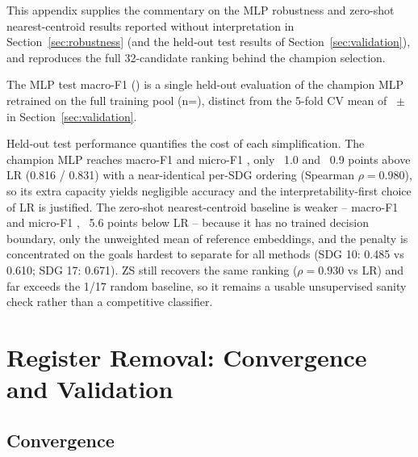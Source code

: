\documentclass[12pt,a4paper]{article}
\let\OldSection\section
\renewcommand{\section}{\clearpage\FloatBarrier\OldSection}
\begin{document}
This appendix supplies the commentary on the MLP robustness and zero-shot
nearest-centroid results reported without interpretation in
Section~\ref{sec:robustness} (and the held-out test results of
Section~\ref{sec:validation}), and reproduces the full 32-candidate ranking
behind the champion selection.

The MLP test macro-F1 (\MlpMacroFOne{}) is a single held-out evaluation of the
champion MLP retrained on the full training pool (n=\NTrainPool{}), distinct
from the 5-fold CV mean of \MlpCvMacroFone{}~$\pm$~\MlpCvMacroFoneStd{} in
Section~\ref{sec:validation}.

Held-out test performance quantifies the cost of each simplification. The
champion MLP reaches macro-F1 \MlpMacroFOne{} and micro-F1 \MlpMicroFOne{}, only
~1.0 and ~0.9 points above LR (0.816 / 0.831) with a near-identical per-SDG
ordering (Spearman $\rho = 0.980$), so its extra capacity yields negligible
accuracy and the interpretability-first choice of LR is justified. The zero-shot
nearest-centroid baseline is weaker -- macro-F1 \ZsMacroFOne{} and micro-F1
\ZsMicroFOne{}, ~5.6 points below LR -- because it has no trained decision
boundary, only the unweighted mean of reference embeddings, and the penalty is
concentrated on the goals hardest to separate for all methods (SDG 10: 0.485 vs
0.610; SDG 17: 0.671). ZS still recovers the same ranking ($\rho = 0.930$
vs LR) and far exceeds the 1/17 random baseline, so it remains a usable
unsupervised sanity check rather than a competitive classifier.

\begin{table}[ht]
\centering
\footnotesize
\caption{Model selection ranking (full): 5-fold GroupKFold cross-validated macro-F1 across all 32 candidates (16 MLP + 16 LR).}
\label{tab:model-selection-appendix}

\end{table}


\clearpage
\section{Register Removal: Convergence and Validation}
\label{app:register-removal}

\subsection{Convergence}\label{app:register-robustness}
\end{document}
